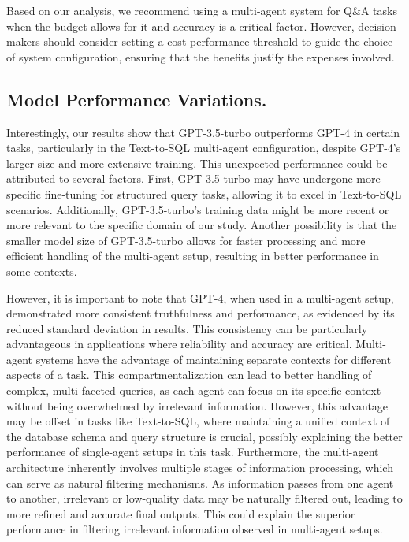             Based on our analysis, we recommend using a multi-agent system for Q\&A tasks when the budget allows for it and accuracy is a critical factor. 
            However, decision-makers should consider setting a cost-performance threshold to guide the choice of system configuration, ensuring that the benefits justify the expenses involved.


        \subsection{Model Performance Variations.}
            Interestingly, our results show that GPT-3.5-turbo outperforms GPT-4 in certain tasks, particularly in the Text-to-SQL multi-agent configuration, despite GPT-4's larger size and more extensive training. 
            This unexpected performance could be attributed to several factors. 
            First, GPT-3.5-turbo may have undergone more specific fine-tuning for structured query tasks, allowing it to excel in Text-to-SQL scenarios. 
            Additionally, GPT-3.5-turbo's training data might be more recent or more relevant to the specific domain of our study. 
            Another possibility is that the smaller model size of GPT-3.5-turbo allows for faster processing and more efficient handling of the multi-agent setup, resulting in better performance in some contexts.

            However, it is important to note that GPT-4, when used in a multi-agent setup, demonstrated more consistent truthfulness and performance, as evidenced by its reduced standard deviation in results. 
            This consistency can be particularly advantageous in applications where reliability and accuracy are critical. 
            Multi-agent systems have the advantage of maintaining separate contexts for different aspects of a task. 
            This compartmentalization can lead to better handling of complex, multi-faceted queries, as each agent can focus on its specific context without being overwhelmed by irrelevant information. However, this advantage may be offset in tasks like Text-to-SQL, where maintaining a unified context of the database schema and query structure is crucial, possibly explaining the better performance of single-agent setups in this task.
            Furthermore, the multi-agent architecture inherently involves multiple stages of information processing, which can serve as natural filtering mechanisms.
            As information passes from one agent to another, irrelevant or low-quality data may be naturally filtered out, leading to more refined and accurate final outputs. 
            This could explain the superior performance in filtering irrelevant information observed in multi-agent setups.
        
